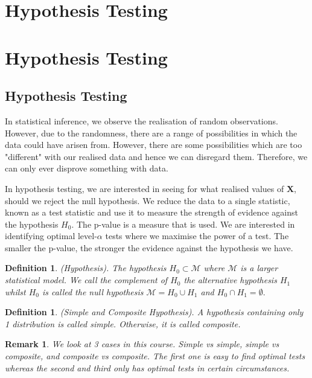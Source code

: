 \documentclass[twoside]{article}
\newtheorem{definition}[theorem]{Definition}
\newtheorem{remark}[theorem]{Remark}
\begin{document}
\section{Hypothesis Testing}
\section{Hypothesis Testing}
\subsection{Hypothesis Testing}
In statistical inference, we observe the realisation of random observations. However, due to the randomness, there are a range of possibilities in which the data could have arisen from. However, there are some possibilities which are too "different" with our realised data and hence we can disregard them. Therefore, we can only ever disprove something with data.

In hypothesis testing, we are interested in seeing for what realised values of $\textbf{X}$, should we reject the null hypothesis. We reduce the data to a single statistic, known as a test statistic and use it to measure the strength of evidence against the hypothesis $H_0$. The p-value is a measure that is used. We are interested in identifying optimal level-$\alpha$ tests where we maximise the power of a test. The smaller the p-value, the stronger the evidence against the hypothesis we have.

\begin{definition}(Hypothesis). The hypothesis $H_0 \subset \mathcal{M}$ where $\mathcal{M}$ is a larger statistical model. We call the complement of $H_0$ the alternative hypothesis $H_1$ whilst $H_0$ is called the null hypothesis $\mathcal{M} = H_0 \cup H_1$ and $H_0 \cap H_1 = \emptyset.$
\end{definition}

\begin{definition}(Simple and Composite Hypothesis). A hypothesis containing only 1 distribution is called simple. Otherwise, it is called composite.
\end{definition}

\begin{remark}We look at 3 cases in this course. Simple vs simple, simple vs composite, and composite vs composite. The first one is easy to find optimal tests whereas the second and third only has optimal tests in certain circumstances.
\end{remark}
\end{document}
